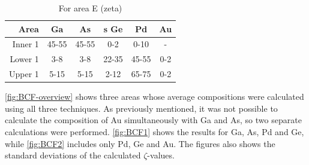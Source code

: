 \begin{table}
	\caption{For area E (zeta)}
	\begin{center}
		\begin{tabular}{r|ccccc}			
			Area & Ga & As &s Ge & Pd & Au\\ 
			\midrule
			\hline
			Inner 1& 45-55 & 45-55 & 0-2 & 0-10 & -\\
			Lower 1& 3-8 & 3-8 & 22-35 & 45-55 & 0-2\\
			Upper 1& 5-15 & 5-15 & 2-12 & 65-75 & 0-2\\
			\hline
		\end{tabular} 
	\end{center}
	\label{tab:E-composition}
\end{table}


\cref{fig:BCF-overview} shows three areas whose average compositions were calculated using all three techniques. As previously mentioned, it was not possible to calculate the composition of Au simultaneously with Ga and As, so two separate calculations were performed. \cref{fig:BCF1} shows the results for Ga, As, Pd and Ge, while \cref{fig:BCF2} includes only Pd, Ge and Au. The figures also shows the standard deviations of the calculated $\zeta$-values.

